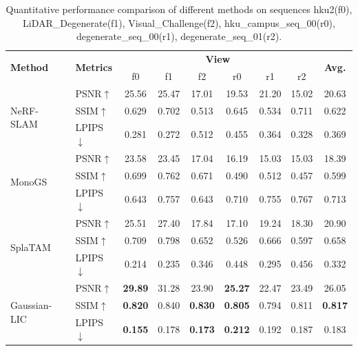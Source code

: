 \documentclass[lettersize,journal]{IEEEtran}
\begin{document}
\begin{table}[htp]
    \centering
    \renewcommand{\arraystretch}{1.0} %
    \setlength{\tabcolsep}{12pt} %
    \caption{Quantitative performance comparison of different methods on sequences hku2(f0), LiDAR_Degenerate(f1), Visual_Challenge(f2), hku_campus_seq_00(r0), degenerate_seq_00(r1), degenerate_seq_01(r2).}
    \label{tab:quantitativecomparison1}
    \begin{tabular}{@{}llccccccc@{}} %
        \toprule
        \multirow{2}{*}{\textbf{Method}} & \multirow{2}{*}{\textbf{Metrics}} & \multicolumn{6}{c}{\textbf{View}} & \multirow{2}{*}{\textbf{Avg.}} \\
        \cmidrule(lr){3-8}
        & & f0 & f1 & f2 & r0 & r1 & r2 &  \\
        \midrule
        \multirow{3}{*}{NeRF-SLAM\cite{nerfslam}} & PSNR$\uparrow$ & 25.56 & 25.47 & 17.01 & 19.53 & 21.20 & 15.02 & 20.63 \\
        & SSIM$\uparrow$ & 0.629 & 0.702 & 0.513 & 0.645 & 0.534 & 0.711 & 0.622 \\
        & LPIPS$\downarrow$ & 0.281 & 0.272 & 0.512 & 0.455 & 0.364 & 0.328 & 0.369 \\
        \midrule
        \multirow{3}{*}{MonoGS\cite{monogs}} & PSNR$\uparrow$ & 23.58 & 23.45 & 17.04 & 16.19 & 15.03 & 15.03 & 18.39 \\
        & SSIM$\uparrow$ & 0.699 & 0.762 & 0.671 & 0.490 & 0.512 & 0.457 & 0.599 \\
        & LPIPS$\downarrow$ & 0.643 & 0.757 & 0.643 & 0.710 & 0.755 & 0.767 & 0.713 \\
        \midrule
        \multirow{3}{*}{SplaTAM\cite{splatam}} & PSNR$\uparrow$ & 25.51 & 27.40 & 17.84 & 17.10 & 19.24 & 18.30 & 20.90 \\
        & SSIM$\uparrow$ & 0.709 & 0.798 & 0.652 & 0.526 & 0.666 & 0.597 & 0.658 \\
        & LPIPS$\downarrow$ & 0.214 & 0.235 & 0.346 & 0.448 & 0.295 & 0.456 & 0.332 \\
        \midrule
        \multirow{3}{*}{Gaussian-LIC\cite{gaussianlic}} & PSNR$\uparrow$ & \textbf{29.89} & 31.28 & 23.90 & \textbf{25.27} & 22.47 & 23.49 & 26.05 \\
        & SSIM$\uparrow$ & \textbf{0.820} & 0.840 & \textbf{0.830} & \textbf{0.805} & 0.794 & 0.811 & \textbf{0.817} \\
        & LPIPS$\downarrow$ & \textbf{0.155} & 0.178 & \textbf{0.173} & \textbf{0.212} & 0.192 & 0.187 & 0.183 \\

\end{tabular}
\end{table}
\end{document}
